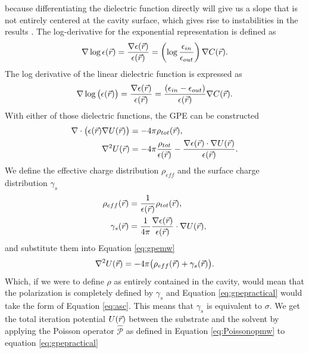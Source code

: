 \documentclass[../master_thesis.tex]{subfiles}
\begin{document}
because differentiating the dielectric function directly will give us a slope that is
not entirely centered at the cavity surface, which gives rise to instabilities in
the results \cite{FossoTande:2013ka}.  The log-derivative for the exponential representation
is defined as \cite{FossoTande:2013ka}
\begin{equation}\label{eq:logderepsexp}
  \nabla\log\epsilon(\vec{r}) = \frac{\nabla\epsilon(\vec{r})}{\epsilon(\vec{r})}
   = \left(\log\frac{\epsilon_{in}}{\epsilon_{out}} \right)\nabla C(\vec{r}).
\end{equation}
The log derivative of the linear dielectric function is expressed as
\begin{equation}\label{eq:logderepslin}
  \nabla \log\big(\epsilon (\vec{r})\big) = \frac{\nabla\epsilon(\vec{r})}{\epsilon(\vec{r})}
  = \frac{(\epsilon_{in} - \epsilon_{out})}{\epsilon(\vec{r})}\nabla C(\vec{r}).
\end{equation}
With either of those dielectric functions, the \ac{GPE} can be constructed
\cite{Sorland, FossoTande:2013ka}
\begin{align}\label{eq:gpemw}
  \nabla\cdot \big(\epsilon(\vec{r})\nabla U(\vec{r})\big) &= -4\pi \rho_{tot}(\vec{r}), \\
  \nabla^2U(\vec{r}) &= -4\pi \frac{\rho_{tot}}{\epsilon(\vec{r})} - \frac{\nabla
  \epsilon(\vec{r})\cdot \nabla U(\vec{r})}{\epsilon(\vec{r})}.
\end{align}
We define the effective charge distribution $\rho_{eff}$ and the surface charge
distribution $\gamma_s$ \cite{FossoTande:2013ka}
\begin{align}\label{eq:effrhogamma}
  \rho_{eff}(\vec{r}) &= \frac{1}{\epsilon(\vec{r})}\rho_{tot}(\vec{r}), \\
  \gamma_s(\vec{r}) &= \frac{1}{4\pi}\frac{\nabla\epsilon(\vec{r})}{\epsilon(\vec{r})}\cdot\nabla U(\vec{r}),
\end{align}
and substitute them into Equation \ref{eq:gpemw}
\begin{equation}\label{eq:gpepractical}
  \nabla^2U(\vec{r}) = -4\pi\big( \rho_{eff}(\vec{r}) + \gamma_s(\vec{r})\big).
\end{equation}
Which, if we were to define $\rho$ as entirely contained in the cavity, would mean
that the polarization is completely defined by $\gamma_s$ and Equation \ref{eq:gpepractical}
would take the form of Equation \ref{eq:asc}. This means that $\gamma_s$ is equivalent to
$\sigma$.
We get the total iteration potential $U(\vec{r})$ between the substrate and the solvent by
applying the Poisson operator $\hat{\mathscr{P}}$ as defined in Equation
\ref{eq:Poissonopmw} to equation \ref{eq:gpepractical}
\end{document}
